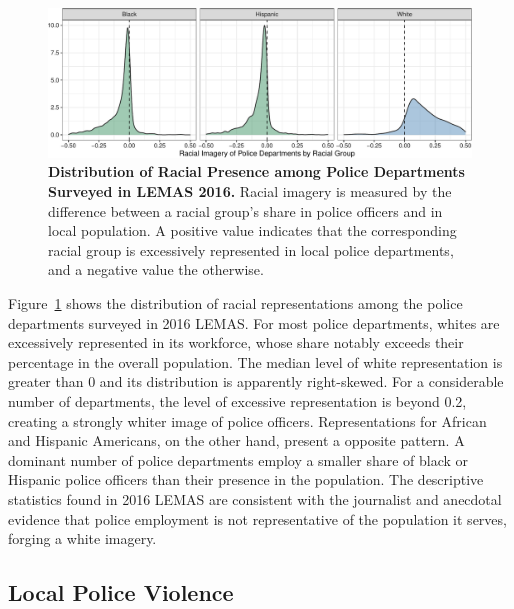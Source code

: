 \documentclass[
  12pt,
]{article}
\begin{document}
\begin{figure}[t]

{\centering \includegraphics{racialized-police_files/figure-pdf/fig-lemas-density-1.pdf}

}

\caption{\label{fig-lemas-density}\textbf{Distribution of Racial
Presence among Police Departments Surveyed in LEMAS 2016.} Racial
imagery is measured by the difference between a racial group's share in
police officers and in local population. A positive value indicates that
the corresponding racial group is excessively represented in local
police departments, and a negative value the otherwise.}

\end{figure}

Figure~\ref{fig-lemas-density} shows the distribution of racial
representations among the police departments surveyed in 2016 LEMAS. For
most police departments, whites are excessively represented in its
workforce, whose share notably exceeds their percentage in the overall
population. The median level of white representation is greater than 0
and its distribution is apparently right-skewed. For a considerable
number of departments, the level of excessive representation is beyond
0.2, creating a strongly whiter image of police officers.
Representations for African and Hispanic Americans, on the other hand,
present a opposite pattern. A dominant number of police departments
employ a smaller share of black or Hispanic police officers than their
presence in the population. The descriptive statistics found in 2016
LEMAS are consistent with the journalist and anecdotal evidence that
police employment is not representative of the population it serves,
forging a white imagery.

\hypertarget{local-police-violence}{%
\subsection{Local Police Violence}\label{local-police-violence}}
\end{document}
